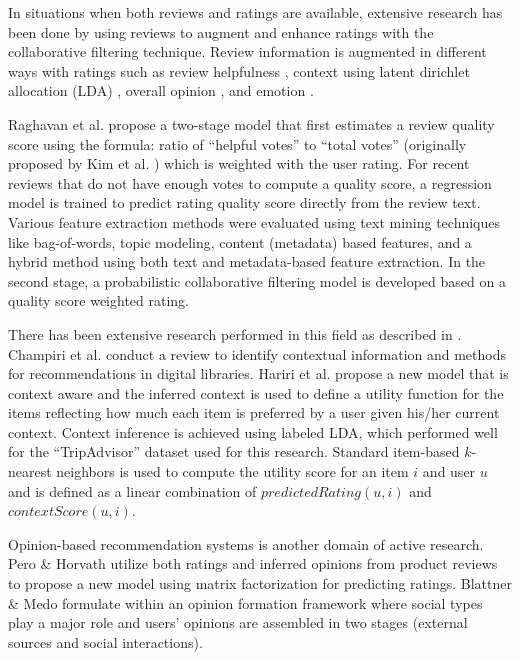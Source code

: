 \documentclass[12pt]{article}
\begin{document}
In situations when both reviews and ratings are available, extensive research has been done by using reviews to augment and enhance ratings with the collaborative filtering technique. Review information is augmented in different ways with ratings such as review helpfulness \cite{raghavan}, context using latent dirichlet allocation (LDA) \cite{hariri-2011, zheng, moshfeghi}, overall opinion \cite{pero, blattner}, and emotion \cite{moshfeghi}.

Raghavan et al. \cite{raghavan} propose a two-stage model that first estimates a review quality score using the formula: ratio of ``helpful votes'' to ``total votes'' (originally proposed by Kim et al. \cite{kim}) which is weighted with the user rating. For recent reviews that do not have enough votes to compute a quality score, a regression model is trained to predict rating quality score directly from the review text. Various feature extraction methods were evaluated using text mining techniques like bag-of-words, topic modeling, content (metadata) based features, and a hybrid method using both text and metadata-based feature extraction. In the second stage, a probabilistic collaborative filtering model is developed based on a quality score weighted rating. 

There has been extensive research performed in this field as described in \cite{champiri, hariri-2011, hariri-2012, zheng, adomavicius-2011}. Champiri et al. \cite{champiri} conduct a review to identify contextual information and methods for recommendations in digital libraries. Hariri et al. \cite{hariri-2011} propose a new model that is context aware and the inferred context is used to define a utility function for the items reflecting how much each item is preferred by a user given his/her current context. Context inference is achieved using labeled LDA, which performed well for the ``TripAdvisor'' dataset used for this research. Standard item-based $k$-nearest neighbors is used to compute the utility score for an item $i$ and user $u$ and is defined as a linear combination of $predictedRating(u, i)$ and $contextScore(u, i)$. 

Opinion-based recommendation systems is another domain of active research. Pero \& Horvath \cite{pero} utilize both ratings and inferred opinions from product reviews to propose a new model using matrix factorization for predicting ratings. Blattner \& Medo \cite{blattner} formulate within an opinion formation framework where social types play a major role and users' opinions are assembled in two stages (external sources and social interactions). 
\end{document}

